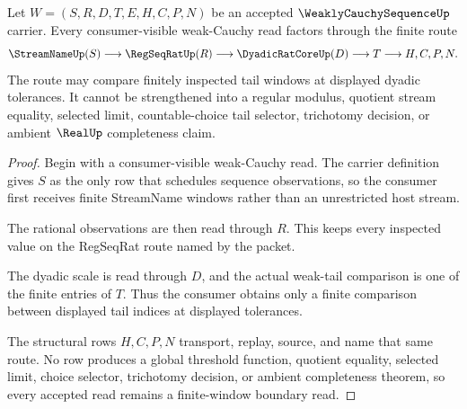 \begin{theorem}
\label{thm:weakly-cauchy-sequence-finite-window-boundary}
Let $W=(S,R,D,T,E,H,C,P,N)$ be an accepted $\WeaklyCauchySequenceUp$ carrier. Every consumer-visible weak-Cauchy read factors through the finite route
$$
\StreamNameUp(S)\longrightarrow \RegSeqRatUp(R)\longrightarrow \DyadicRatCoreUp(D)\longrightarrow T\longrightarrow H,C,P,N .
$$
The route may compare finitely inspected tail windows at displayed dyadic tolerances. It cannot be strengthened into a regular modulus, quotient stream equality, selected limit, countable-choice tail selector, trichotomy decision, or ambient $\RealUp$ completeness claim.
\end{theorem}
\begin{proof}
Begin with a consumer-visible weak-Cauchy read. The carrier definition gives $S$ as the only row that schedules sequence observations, so the consumer first receives finite StreamName windows rather than an unrestricted host stream.

The rational observations are then read through $R$. This keeps every inspected value on the RegSeqRat route named by the packet.

The dyadic scale is read through $D$, and the actual weak-tail comparison is one of the finite entries of $T$. Thus the consumer obtains only a finite comparison between displayed tail indices at displayed tolerances.

The structural rows $H,C,P,N$ transport, replay, source, and name that same route. No row produces a global threshold function, quotient equality, selected limit, choice selector, trichotomy decision, or ambient completeness theorem, so every accepted read remains a finite-window boundary read.
\end{proof}

